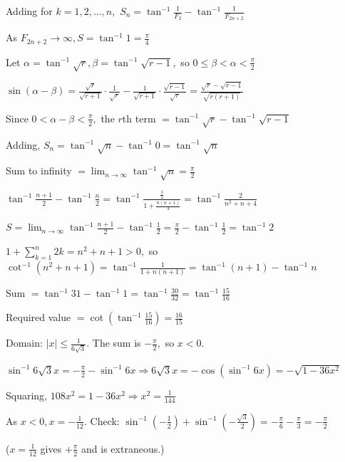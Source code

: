   Adding for $k = 1, 2, \ldots, n,$ $S_n = \tan^{-1}\frac{1}{F_2} - \tan^{-1}\frac{1}{F_{2n + 2}}$

  As $F_{2n + 2}\to\infty, S = \tan^{-1}1 = \frac{\pi}{4}$

\item Let $\alpha = \tan^{-1}\sqrt{r}, \beta = \tan^{-1}\sqrt{r - 1},$ so $0\leq \beta < \alpha < \frac{\pi}{2}$

  $\sin(\alpha - \beta) = \frac{\sqrt{r}}{\sqrt{r + 1}}\cdot\frac{1}{\sqrt{r}} - \frac{1}{\sqrt{r + 1}}\cdot\frac{\sqrt{r -
      1}}{\sqrt{r}} = \frac{\sqrt{r} - \sqrt{r - 1}}{\sqrt{r(r + 1)}}$

  Since $0 < \alpha - \beta < \frac{\pi}{2},$ the $r$th term $= \tan^{-1}\sqrt{r} - \tan^{-1}\sqrt{r - 1}$

  Adding, $S_n = \tan^{-1}\sqrt{n} - \tan^{-1}0 = \tan^{-1}\sqrt{n}$

  Sum to infinity $= \lim_{n\to\infty}\tan^{-1}\sqrt{n} = \frac{\pi}{2}$

\item $\tan^{-1}\frac{n + 1}{2} - \tan^{-1}\frac{n}{2} = \tan^{-1}\frac{\frac{1}{2}}{1 + \frac{n(n + 1)}{4}} =
  \tan^{-1}\frac{2}{n^2 + n + 4}$

  $S = \lim_{n\to\infty}\tan^{-1}\frac{n + 1}{2} - \tan^{-1}\frac{1}{2} = \frac{\pi}{2} - \tan^{-1}\frac{1}{2} = \tan^{-1}2$

\item $1 + \sum_{k = 1}^n2k = n^2 + n + 1 > 0,$ so $\cot^{-1}(n^2 + n + 1) = \tan^{-1}\frac{1}{1 + n(n + 1)} = \tan^{-1}(n + 1) -
  \tan^{-1}n$

  Sum $= \tan^{-1}31 - \tan^{-1}1 = \tan^{-1}\frac{30}{32} = \tan^{-1}\frac{15}{16}$

  Required value $= \cot\left(\tan^{-1}\frac{15}{16}\right) = \frac{16}{15}$

\item Domain: $|x|\leq \frac{1}{6\sqrt{3}}.$ The sum is $-\frac{\pi}{2},$ so $x < 0.$

  $\sin^{-1}6\sqrt{3}x = -\frac{\pi}{2} - \sin^{-1}6x \Rightarrow 6\sqrt{3}x = -\cos(\sin^{-1}6x) = -\sqrt{1 - 36x^2}$

  Squaring, $108x^2 = 1 - 36x^2 \Rightarrow x^2 = \frac{1}{144}$

  As $x < 0, x = -\frac{1}{12}.$ Check: $\sin^{-1}\left(-\frac{1}{2}\right) + \sin^{-1}\left(-\frac{\sqrt{3}}{2}\right) =
  -\frac{\pi}{6} - \frac{\pi}{3} = -\frac{\pi}{2}$

  ($x = \frac{1}{12}$ gives $+\frac{\pi}{2}$ and is extraneous.)


